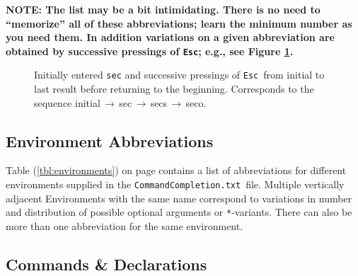 \documentclass[11pt]{article}
\newcommand{\esckey}{\texttt{Esc}}
\newcommand{\To}{\,\(\to\)\,}
\newcommand{\CCT}{\texttt{CommandCompletion.txt}}
\begin{document}
\textbf{NOTE: The list may be a bit intimidating. There is no need to ``memorize'' all of these abbreviations; learn the minimum number as you need them. In addition variations on a given abbreviation are obtained by successive pressings of \esckey; e.g., see Figure \ref{fig:sec}.}
\begin{figure}\centering
{}
\caption{Initially entered \texttt{sec} and successive pressings of \esckey\ from initial to last result before returning to the beginning. Corresponds to the sequence \textsf{initial}\To\textsf{sec}\To\textsf{secs}\To\textsf{seco}.}
\label{fig:sec}
\end{figure}

\subsection*{Environment Abbreviations}

Table (\ref{tbl:environments}) on page \pageref{tbl:environments} contains a list of abbreviations for different environments supplied in the \CCT\ file. Multiple vertically adjacent Environments with the same name correspond to variations in number and distribution of possible optional arguments or \texttt{*}-variants. There can also be more than one abbreviation for the same environment.

\subsection*{Commands \& Declarations}
\end{document}
